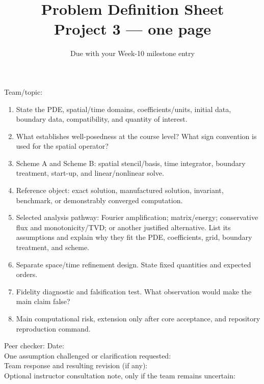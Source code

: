 \documentclass[11pt]{article}\usepackage[a4paper,margin=2cm]{geometry}\usepackage{enumitem}
\title{Problem Definition Sheet\\ \large Project 3 --- one page}\author{}\date{Due with your Week-10 milestone entry}
\begin{document}
\maketitle
Team/topic: \hrulefill
\begin{enumerate}[leftmargin=*]
\item State the PDE, spatial/time domains, coefficients/units, initial data, boundary data, compatibility, and quantity of interest.
\item What establishes well-posedness at the course level? What sign convention is used for the spatial operator?
\item Scheme A and Scheme B: spatial stencil/basis, time integrator, boundary treatment, start-up, and linear/nonlinear solve.
\item Reference object: exact solution, manufactured solution, invariant, benchmark, or demonstrably converged computation.
\item Selected analysis pathway: Fourier amplification; matrix/energy; conservative flux and monotonicity/TVD; or another justified alternative. List its assumptions and explain why they fit the PDE, coefficients, grid, boundary treatment, and scheme.
\item Separate space/time refinement design. State fixed quantities and expected orders.
\item Fidelity diagnostic and falsification test. What observation would make the main claim false?
\item Main computational risk, extension only after core acceptance, and repository reproduction command.
\end{enumerate}
Peer checker: \hrulefill\quad Date: \hrulefill\\[0.4cm]
One assumption challenged or clarification requested: \vspace{1.5cm}\\
Team response and resulting revision (if any): \vspace{1.5cm}\\
Optional instructor consultation note, only if the team remains uncertain: \vspace{1cm}
\end{document}

